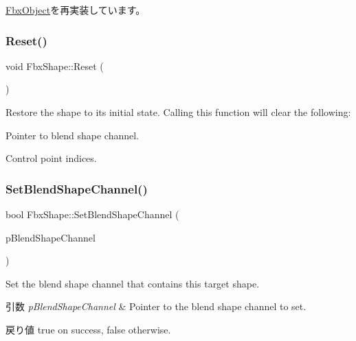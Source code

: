 \hyperlink{class_fbx_object_a6d30a5d00400039a248977cf9f9255b2}{Fbx\+Object}を再実装しています。

\mbox{\label{class_fbx_shape_afe25ad1148c4165f9821cc7bc7b50c94}} 
\subsubsection{\texorpdfstring{Reset()}{Reset()}}
{\footnotesize\ttfamily void Fbx\+Shape\+::\+Reset (\begin{DoxyParamCaption}{ }\end{DoxyParamCaption})}

Restore the shape to its initial state. Calling this function will clear the following\+: \begin{DoxyItemize}
\item Pointer to blend shape channel. \item Control point indices. \end{DoxyItemize}
\mbox{\label{class_fbx_shape_ae3e784d16a332f9c874f745846a2980e}} 
\subsubsection{\texorpdfstring{Set\+Blend\+Shape\+Channel()}{SetBlendShapeChannel()}}
{\footnotesize\ttfamily bool Fbx\+Shape\+::\+Set\+Blend\+Shape\+Channel (\begin{DoxyParamCaption}\item[{\hyperlink{class_fbx_blend_shape_channel}{Fbx\+Blend\+Shape\+Channel} $\ast$}]{p\+Blend\+Shape\+Channel }\end{DoxyParamCaption})}

Set the blend shape channel that contains this target shape. 
\begin{DoxyParams}{引数}
{\em p\+Blend\+Shape\+Channel} & Pointer to the blend shape channel to set. \\
\hline
\end{DoxyParams}
\begin{DoxyReturn}{戻り値}
{\ttfamily true} on success, {\ttfamily false} otherwise. 
\end{DoxyReturn}
\mbox{\label{class_fbx_shape_a6c62c9590c9634305a65f50916eaded3}} 
